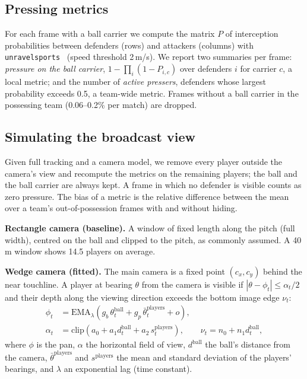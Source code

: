 \documentclass[runningheads]{llncs}
\begin{document}
\subsection{Pressing metrics}
For each frame with a ball carrier we compute the matrix $P$ of interception probabilities between defenders
(rows) and attackers (columns) with \texttt{unravelsports}~\cite{unravelsports} (speed threshold 2\,m/s). We report
two summaries per frame:
\emph{pressure on the ball carrier}, $1 - \prod_i (1 - P_{i,c})$ over defenders $i$ for carrier $c$, a local metric; and
the number of \emph{active pressers}, defenders whose largest probability exceeds 0.5, a team-wide metric.
Frames without a ball carrier in the possessing team (0.06--0.2\% per match) are dropped.

\subsection{Simulating the broadcast view}
Given full tracking and a camera model, we remove every player outside the camera's view and recompute the metrics
on the remaining players; the ball and the ball carrier are always kept. A frame in which no defender is visible
counts as zero pressure. The bias of a metric is the relative difference between the mean over a team's
out-of-possession frames with and without hiding.

\textbf{Rectangle camera (baseline).} A window of fixed length along the pitch (full width), centred on the ball and
clipped to the pitch, as commonly assumed. A 40\,m window shows 14.5 players on average.

\textbf{Wedge camera (fitted).} The main camera is a fixed point $(c_x, c_y)$ behind the near touchline. A player at
bearing $\theta$ from the camera is visible if $|\theta - \phi_t| \le \alpha_t/2$ and their depth along the viewing
direction exceeds the bottom image edge $\nu_t$:
\begin{align}
\phi_t &= \mathrm{EMA}_{\lambda}\!\left(g_b\,\theta^{\text{ball}}_t + g_p\,\bar\theta^{\text{players}}_t + o\right),\\
\alpha_t &= \mathrm{clip}\!\left(a_0 + a_1 d^{\text{ball}}_t + a_2\, s^{\text{players}}_t\right),\qquad
\nu_t = n_0 + n_1 d^{\text{ball}}_t,
\end{align}
where $\phi$ is the pan, $\alpha$ the horizontal field of view, $d^{\text{ball}}$ the ball's distance from the camera,
$\bar\theta^{\text{players}}$ and $s^{\text{players}}$ the mean and standard deviation of the players' bearings, and
$\lambda$ an exponential lag (time constant).
\end{document}
